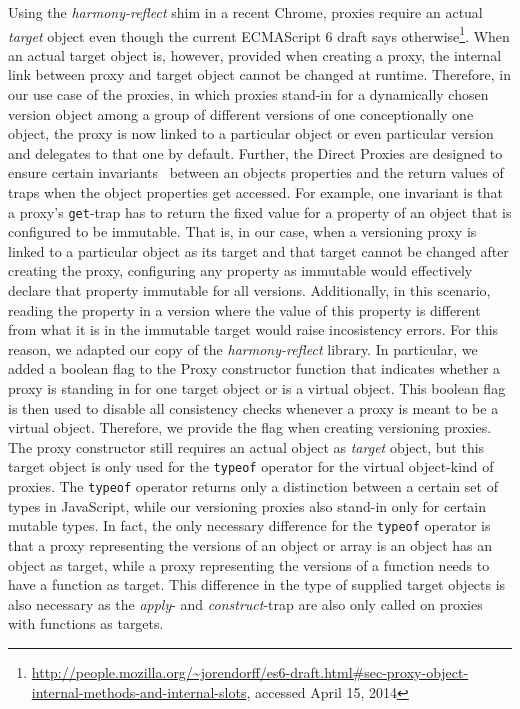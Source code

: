 Using the \emph{harmony-reflect} shim in a recent Chrome, proxies require an actual \emph{target} object even though the current ECMAScript 6 draft says otherwise\footnote{\url{http://people.mozilla.org/~jorendorff/es6-draft.html\#sec-proxy-object-internal-methods-and-internal-slots}, accessed April 15, 2014}.
When an actual target object is, however, provided when creating a proxy, the internal link between proxy and target object cannot be changed at runtime.
Therefore, in our use case of the proxies, in which proxies stand-in for a dynamically chosen version object among a group of different versions of one conceptionally one object, the proxy is now linked to a particular object or even particular version and delegates to that one by default.
Further, the Direct Proxies are designed to ensure certain invariants~\cite{Cutsem2013TRP} between an objects properties and the return values of traps when the object properties get accessed.
For example, one invariant is that a proxy's \lstinline{get}-trap has to return the fixed value for a property of an object that is configured to be immutable.
That is, in our case, when a versioning proxy is linked to a particular object as its target and that target cannot be changed after creating the proxy, configuring any property as immutable would effectively declare that property immutable for all versions.
Additionally, in this scenario, reading the property in a version where the value of this property is different from what it is in the immutable target would raise incosistency errors.
For this reason, we adapted our copy of the \emph{harmony-reflect} library.
In particular, we added a boolean flag to the Proxy constructor function that indicates whether a proxy is standing in for one target object or is a virtual object.
This boolean flag is then used to disable all consistency checks whenever a proxy is meant to be a virtual object.
Therefore, we provide the flag when creating versioning proxies.
The proxy constructor still requires an actual object as \emph{target} object, but this target object is only used for the \lstinline{typeof} operator for the virtual object-kind of proxies.
The \lstinline{typeof} operator returns only a distinction between a certain set of types in JavaScript, while our versioning proxies also stand-in only for certain mutable types.
In fact, the only necessary difference for the \lstinline{typeof} operator is that a proxy representing the versions of an object or array is an object has an object as target, while a proxy representing the versions of a function needs to have a function as target.
This difference in the type of supplied target objects is also necessary as the \emph{apply}- and \emph{construct}-trap are also only called on proxies with functions as targets.

